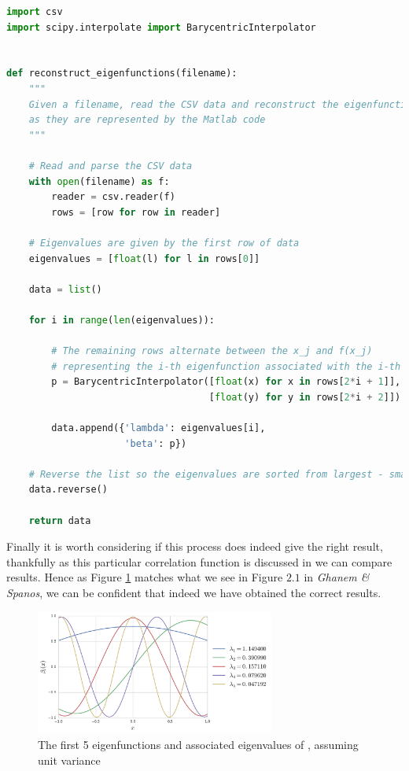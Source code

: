 \begin{lstlisting}[caption={Python code which reconstructs the eigenfunctions
                            we found using Matlab},
                   label={code:python-reconstruct-eigen},
                   language=Python]
import csv
import scipy.interpolate import BarycentricInterpolator


def reconstruct_eigenfunctions(filename):
    """
    Given a filename, read the CSV data and reconstruct the eigenfunctions
    as they are represented by the Matlab code
    """

    # Read and parse the CSV data
    with open(filename) as f:
        reader = csv.reader(f)
        rows = [row for row in reader]

    # Eigenvalues are given by the first row of data
    eigenvalues = [float(l) for l in rows[0]]

    data = list()

    for i in range(len(eigenvalues)):

        # The remaining rows alternate between the x_j and f(x_j)
        # representing the i-th eigenfunction associated with the i-th eigenvalue
        p = BarycentricInterpolator([float(x) for x in rows[2*i + 1]],
                                    [float(y) for y in rows[2*i + 2]])

        data.append({'lambda': eigenvalues[i],
                     'beta': p})

    # Reverse the list so the eigenvalues are sorted from largest - smallest
    data.reverse()

    return data
\end{lstlisting}

Finally it is worth considering if this process does indeed give the right
result, thankfully as this particular correlation function
 is discussed in
\cite{stochastic-fem} we can compare results. Hence as Figure
\ref{fig:kle-eigenfunctions} matches what we see in Figure $2.1$ in
\textit{Ghanem \& Spanos}, we can be confident that indeed we have obtained the
correct results.

\begin{figure}
    \centering
    \includegraphics[width=0.7\textwidth]{img/kle-eigenfunctions.pdf}
    \caption{The first 5 eigenfunctions and associated eigenvalues of
             , assuming unit
             variance}
    \label{fig:kle-eigenfunctions}
\end{figure}

